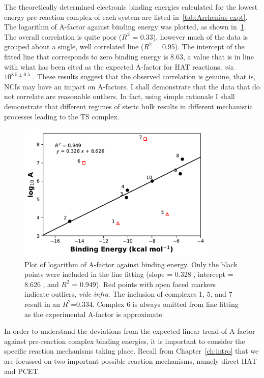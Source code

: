 The theoretically determined electronic binding energies calculated for the
lowest energy pre-reaction complex of each system are listed
in~\ref{tab:Arrhenius-expt}. The logarithm of A-factor against binding energy
was plotted, as shown in~\ref{fig:Arrhenius}. The overall correlation is quite
poor ($R^2$ = 0.33), however much of the data is grouped about a single, well
correlated line ($R^2$ = 0.95). The intercept of the fitted line that
corresponds to zero binding energy is 8.63, a value that is in line with what
has been cited as the expected A-factor for HAT reactions, \emph{viz.
}$10^{8.5\pm0.5}$ \Ms.\cite{Benson1976} These results suggest that the observed
correlation is genuine, that is, NCIs may have an impact on A-factors. I shall
demonstrate that the data that do not correlate are reasonable outliers. In
fact, using simple rationale I shall demonstrate that different regimes of
steric bulk results in different mechanistic processes leading to the TS
complex.

\begin{figure}[!htbp]
  \centering
  \includegraphics[width=0.85\textwidth]{figures/arrhenius-scatter.pdf}
  \caption[Plot of logarithm of A-factor against binding energy.]{Plot of
  logarithm of A-factor against binding energy. Only the black points were
  included in the line fitting (slope = 0.328 \kcalmol, intercept = 8.626
  \kcalmol, and $R^2$ = 0.949). Red points with open faced markers indicate
  outliers, \emph{vide infra}. The inclusion of complexes 1, 5, and 7 result in
  an $R^2$=0.334. Complex 6 is always omitted from line fitting as the
  experimental A-factor is approximate.}
  \label{fig:Arrhenius}
\end{figure}

In order to understand the deviations from the expected linear trend of A-factor
against pre-reaction complex binding energies, it is important to consider the
specific reaction mechanisms taking place. Recall from Chapter~\ref{ch:intro}
that we are focussed on two important possible reaction mechanisms, namely
direct HAT and PCET.

